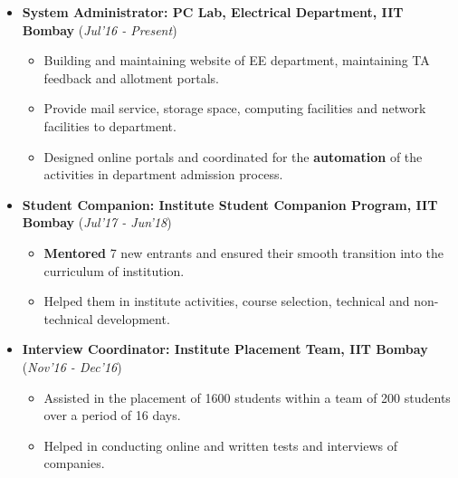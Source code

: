 \documentclass[10pt]{article}
\begin{document}
\begin{itemize}[leftmargin=0.4cm]
\vspace{-0.2cm}
\item \textbf {System Administrator: PC Lab, Electrical Department, IIT Bombay} 
\hfill{(\textit{Jul'16 - Present})}\\[-0.6cm]
    \begin{itemize}
	\item Building and maintaining website of EE department, maintaining TA feedback and allotment portals.\vspace{-0.1cm}
	\item Provide mail service, storage space, computing facilities and network facilities to department.\vspace{-0.1cm}
	\item Designed online portals and coordinated for the \textbf{automation} of the activities in department admission process.
	\end{itemize}
	\vspace{-0.25cm}
	
	
\item \textbf{Student Companion: Institute Student Companion Program, IIT Bombay}
\hfill{(\textit{Jul'17 - Jun'18})}\\[-0.6cm]
    \begin{itemize}
			\item \textbf{Mentored} 7 new entrants and ensured their smooth transition into the curriculum of institution.\vspace{-0.1cm}
            \item Helped them in institute activities, course selection, technical and non-technical development.
		\end{itemize}
		\vspace{-0.25cm}
	
\item \textbf{Interview Coordinator: Institute Placement Team, IIT Bombay}
\hfill{(\textit{Nov'16 - Dec'16})}\\[-0.6cm]
    \begin{itemize}
            \item Assisted in the placement of 1600 students within a team of 200 students over a period of 16 days.\vspace{-0.1cm}
            \item Helped in conducting online and written tests and interviews of companies.
		\end{itemize}
		\vspace{-0.25cm}	



\end{itemize}
\end{document}
